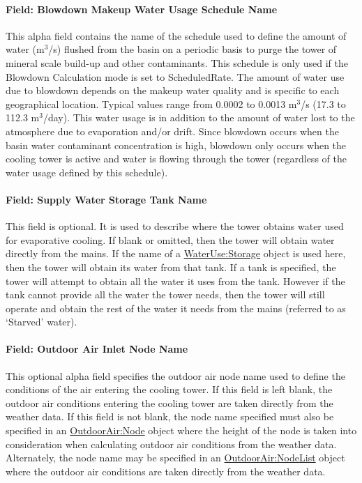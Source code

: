 \paragraph{Field: Blowdown Makeup Water Usage Schedule Name}\label{field-blowdown-makeup-water-usage-schedule-name-1}

This alpha field contains the name of the schedule used to define the amount of water (m\(^{3}\)/s) flushed from the basin on a periodic basis to purge the tower of mineral scale build-up and other contaminants. This schedule is only used if the Blowdown Calculation mode is set to ScheduledRate. The amount of water use due to blowdown depends on the makeup water quality and is specific to each geographical location. Typical values range from 0.0002 to 0.0013 m\(^{3}\)/s (17.3 to 112.3 m\(^{3}\)/day). This water usage is in addition to the amount of water lost to the atmosphere due to evaporation and/or drift. Since blowdown occurs when the basin water contaminant concentration is high, blowdown only occurs when the cooling tower is active and water is flowing through the tower (regardless of the water usage defined by this schedule).

\paragraph{Field: Supply Water Storage Tank Name}\label{field-supply-water-storage-tank-name-1}

This field is optional. It is used to describe where the tower obtains water used for evaporative cooling. If blank or omitted, then the tower will obtain water directly from the mains. If the name of a \hyperref[waterusestorage]{WaterUse:Storage} object is used here, then the tower will obtain its water from that tank. If a tank is specified, the tower will attempt to obtain all the water it uses from the tank. However if the tank cannot provide all the water the tower needs, then the tower will still operate and obtain the rest of the water it needs from the mains (referred to as `Starved' water).

\paragraph{Field: Outdoor Air Inlet Node Name}\label{field-outdoor-air-inlet-node-name-1}

This optional alpha field specifies the outdoor air node name used to define the conditions of the air entering the cooling tower. If this field is left blank, the outdoor air conditions entering the cooling tower are taken directly from the weather data. If this field is not blank, the node name specified must also be specified in an \hyperref[outdoorairnode]{OutdoorAir:Node} object where the height of the node is taken into consideration when calculating outdoor air conditions from the weather data. Alternately, the node name may be specified in an \hyperref[outdoorairnodelist]{\hyperref[outdoorairnode]{OutdoorAir:Node}List} object where the outdoor air conditions are taken directly from the weather data.

